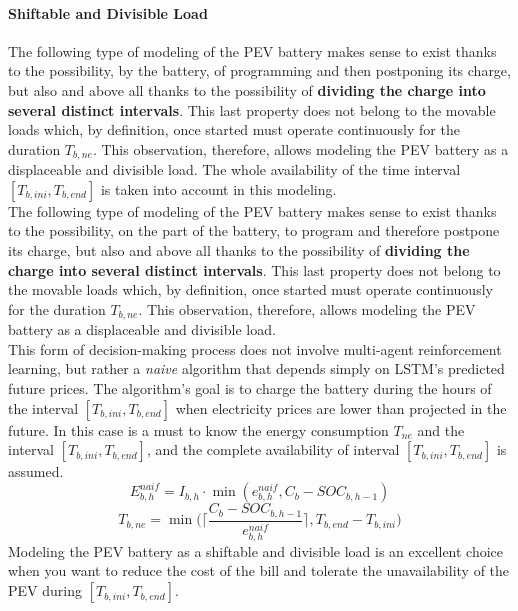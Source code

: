 \paragraph{Shiftable and Divisible Load}
The following type of modeling of the PEV battery makes sense to exist thanks to the possibility, by the battery, of programming and then postponing its charge, but also and above all thanks to the possibility of \textbf{dividing the charge into several distinct intervals}. This last property does not belong to the movable loads which, by definition, once started must operate continuously for the duration $T_{b,ne}$. This observation, therefore, allows modeling the PEV battery as a displaceable and divisible load. The whole availability of the time interval $[T_{b,ini}, T_{b,end}]$ is taken into account in this modeling.\\
The following type of modeling of the PEV battery makes sense to exist thanks to the possibility, on the part of the battery, to program and therefore postpone its charge, but also and above all thanks to the possibility of \textbf{dividing the charge into several distinct intervals}. This last property does not belong to the movable loads which, by definition, once started must operate continuously for the duration $T_{b,ne}$. This observation, therefore, allows modeling the PEV battery as a displaceable and divisible load.\\
This form of decision-making process does not involve multi-agent reinforcement learning, but rather a \textit{naive} algorithm that depends simply on LSTM's predicted future prices. The algorithm's goal is to charge the battery during the hours of the interval $[T_{b,ini}, T_{b,end}]$ when electricity prices are lower than projected in the future. In this case is a must to know the energy consumption $T_{ne}$ and the interval $[T_{b,ini}, T_{b,end}]$, and the complete availability of interval $[T_{b,ini}, T_{b,end}]$ is assumed.\\
\begin{equation}
    E^{naif}_{b,h} = I_{b,h} \cdot \min(e^{naif}_{b,h}, C_b - SOC_{b,h-1})
\end{equation}
\begin{equation}
    T_{b,ne} = \min \Bigg( \Bigg \lceil \frac{C_b - SOC_{b,h-1}}{e^{naif}_{b,h}} \Bigg \rceil, T_{b,end}-T_{b,ini} \Bigg)
\end{equation}
Modeling the PEV battery as a shiftable and divisible load is an excellent choice when you want to reduce the cost of the bill and tolerate the unavailability of the PEV during $[T_{b,ini}, T_{b,end}]$.

